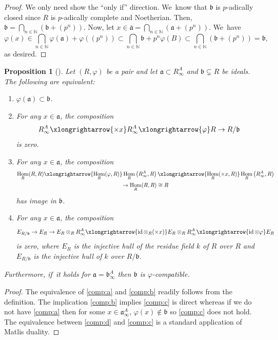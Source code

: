 \documentclass[JEP,XML,SOM,Unicode,published]{cedram}
\theoremstyle{plain}
\newtheorem{proposition}[theorem]{Proposition}
\theoremstyle{definition}
\numberwithin{equation}{theorem}
\let\tensor\otimes
\newcommand{\N}{\mathbb {N}}
\newcommand{\fra}{\mathfrak{a}}
\newcommand{\frab}{\mathfrak{b}}
\DeclareMathOperator{\Hom}{Hom}
\DeclareMathOperator{\id}{{id}}
\renewcommand{\phi}{\varphi}
\newcommand{\rphi}{(R,\phi)}
\newcommand{\rafty}{R^A_\infty}
\newcommand{\aafty}{\fra^A_\infty}
\begin{document}
\begin{proof}
We only need show the ``only if'' direction. We~know that $\frab$ is $p$-adically closed since $R$ is $p$-adically complete and Noetherian. Then, $\frab=\bigcap_{n\in \N} (\frab+ (p^n))$. Now, let $x\in \bar{\fra} = \bigcap_{n\in \N} (\fra+ (p^n))$. We~have \[
\phi(x)\in \bigcap_{n\in \N} \phi(\fra)+\phi((p^n))\subset \bigcap_{n\in \N} \frab+p^n\phi\left(B\right) \subset \bigcap_{n\in \N} (\frab+ (p^n))=\frab,
\]
as desired.
\end{proof}

\begin{proposition}[{\cf \cite[Lem.\,5.1]{SchwedeCentersOfFPurity}}]\label{comp ideal of pair injective hull}
Let $\rphi$ be a pair and let $\fra\subset \rafty$ and $\frab \subsetneq R$ be ideals. The following are equivalent:

\begin{enumerate}
\item\label{comp:a} $\phi\left(\fra\right)\subset \frab$.
\item\label{comp:b} For any $x\in \fra$, the composition\vspace*{-3pt}
\[
\rafty \xlongrightarrow{\times x} \rafty \xlongrightarrow{\phi} R \to R/\frab
\]
is zero.
\item\label{comp:c} For any $x\in \fra$, the composition\vspace*{-5pt}
\begin{multline*}
\Hom_R(R,R)\xlongrightarrow{\Hom_R(\phi,R)}\Hom_R\left(\rafty,R\right)\xlongrightarrow{\Hom_R(\times x, R)}\Hom_R\left(\rafty,R\right)\\
\to \Hom_R(R,R)\cong R
\end{multline*}
has image in $\frab$.
\item\label{comp:d}
For any $x\in \fra$, the composition\vspace*{-3pt}
\[
E_{R/\frab} \to E_R \to E_R\tensor_R \rafty \xlongrightarrow{\id\tensor_R (\times x)} E_R\tensor_R \rafty \xlongrightarrow{\id \tensor \phi} E_R
\]
is zero, where $E_R$ is the injective hull of the residue field $k$ of $R$ over $R$ and $E_{R/\frab} $ is the injective hull of $k$ over $R/\frab$.
\end{enumerate}

Furthermore, if~it holds for $\fra=\frab^A_\infty$ then $\frab$ is $\phi$-compatible.
\end{proposition}

\begin{proof}
The equivalence of \eqref{comp:a} and \eqref{comp:b} readily follows from the definition. The implication \eqref{comp:b} implies \eqref{comp:c} is direct whereas if we do not have \eqref{comp:a} then for some $x\in \aafty$, $\phi(x)\notin \frab$ so \eqref{comp:c} does not hold.
The equivalence between \eqref{comp:d} and \eqref{comp:c} is a standard application of Matlis duality.
\end{proof}
\end{document}
